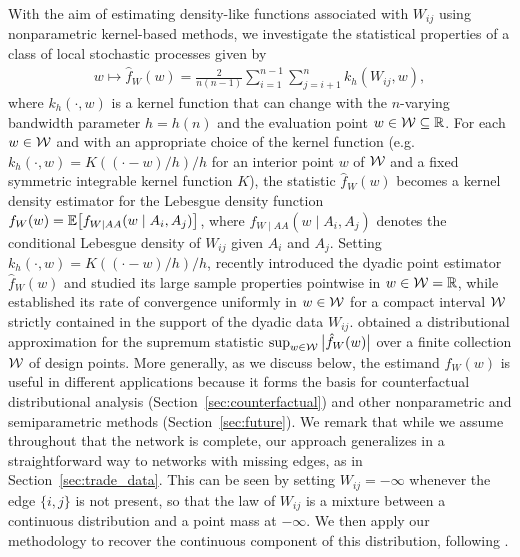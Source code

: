 With the aim of estimating density-like functions
associated with $W_{i j}$ using
nonparametric kernel-based methods,
we investigate the statistical properties of a class
of local stochastic processes given by
%
\begin{align}\label{eq:kernel_estimator}
  w \mapsto \hat{f}_W(w)
  = \frac{2}{n(n-1)} \sum_{i=1}^{n-1} \sum_{j=i+1}^n k_h(W_{i j},w),
\end{align}
%
where $k_h(\cdot,w)$ is a kernel function
that can change with the $n$-varying bandwidth parameter
$h=h(n)$ and the evaluation point
$w \in \mathcal{W}\subseteq \mathbb{R}$. For each $w\in\mathcal{W}$ and with an appropriate choice of
the kernel function
(e.g.\ $k_h(\cdot,w)=K((\cdot-w)/h)/h$ for an interior point $w$
of $\mathcal{W}$ and a fixed symmetric integrable kernel function $K$),
the statistic $\hat{f}_W(w)$ becomes a kernel density estimator
for the Lebesgue density function
$f_W(w) = \mathbb{E}\big[f_{W \mid AA}(w \mid A_i,A_j)\big]$,
where $f_{W \mid AA}(w \mid A_i,A_j)$ denotes the conditional Lebesgue density
of $W_{i j}$ given $A_i$ and $A_j$.
Setting
$k_h(\cdot,w)=K((\cdot-w)/h)/h$, \citet{graham2022kernel}
recently introduced the dyadic point estimator $\hat{f}_W(w)$ and studied
its large sample properties pointwise in $w\in\mathcal{W}=\mathbb{R}$, while
\citet{chiang2020empirical} established its rate of convergence uniformly in
$w\in\mathcal{W}$ for a compact interval $\mathcal{W}$ strictly contained in the support of
the dyadic data $W_{i j}$.
\citet{chiang2022inference} obtained a distributional approximation for the
supremum statistic $\sup_{w\in\mathcal{W}}\big|\hat{f}_W(w)\big|$
over a finite collection $\mathcal{W}$ of design points.
More generally, as we discuss below,
the estimand $f_W(w)$ is useful in
different applications because it forms the basis for
counterfactual distributional analysis
(Section~\ref{sec:counterfactual})
and other nonparametric and semiparametric methods
(Section~\ref{sec:future}).
We remark that while we assume throughout that the network is complete,
our approach generalizes in a straightforward way to networks
with missing edges, as in Section~\ref{sec:trade_data}.
This can be seen by setting $W_{i j} = -\infty$
whenever the edge $\{i, j\}$ is not present, so that the law of
$W_{i j}$ is a mixture between a continuous distribution and a point mass
at $-\infty$.
We then apply our methodology to recover the
continuous component of this distribution,
following \citet{chiang2022inference}.

